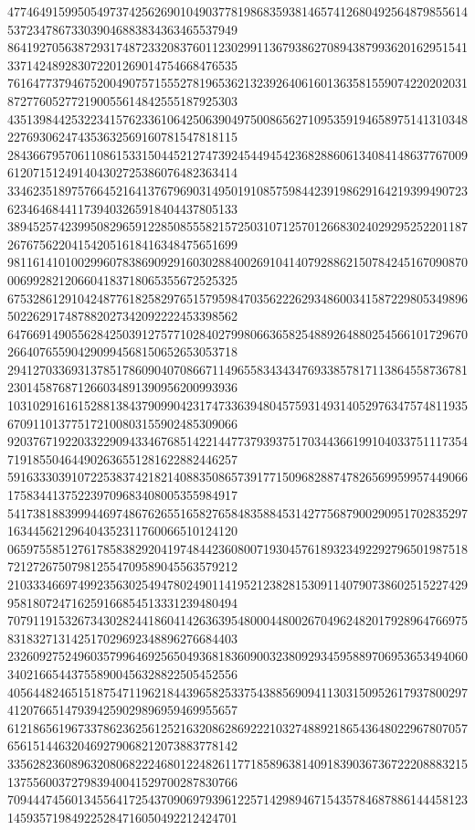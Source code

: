 \begin{DoxyCode}
      477464915995054973742562690104903778198683593814657412680492564879855614537234786733039046883834363465537949
      864192705638729317487233208376011230299113679386270894387993620162951541337142489283072201269014754668476535
      761647737946752004907571555278196536213239264061601363581559074220202031872776052772190055614842555187925303
      435139844253223415762336106425063904975008656271095359194658975141310348227693062474353632569160781547818115
      284366795706110861533150445212747392454494542368288606134084148637767009612071512491404302725386076482363414
      334623518975766452164137679690314950191085759844239198629164219399490723623464684411739403265918404437805133
      389452574239950829659122850855582157250310712570126683024029295252201187267675622041542051618416348475651699
      981161410100299607838690929160302884002691041407928862150784245167090870006992821206604183718065355672525325
      675328612910424877618258297651579598470356222629348600341587229805349896502262917487882027342092222453398562
      647669149055628425039127577102840279980663658254889264880254566101729670266407655904290994568150652653053718
      294127033693137851786090407086671149655834343476933857817113864558736781230145876871266034891390956200993936
      103102916161528813843790990423174733639480457593149314052976347574811935670911013775172100803155902485309066
      920376719220332290943346768514221447737939375170344366199104033751117354719185504644902636551281622882446257
      591633303910722538374218214088350865739177150968288747826569959957449066175834413752239709683408005355984917
      541738188399944697486762655165827658483588453142775687900290951702835297163445621296404352311760066510124120
      065975585127617858382920419748442360800719304576189323492292796501987518721272675079812554709589045563579212
      210333466974992356302549478024901141952123828153091140790738602515227429958180724716259166854513331239480494
      707911915326734302824418604142636395480004480026704962482017928964766975831832713142517029692348896276684403
      232609275249603579964692565049368183609003238092934595889706953653494060340216654437558900456328822505452556
      405644824651518754711962184439658253375438856909411303150952617937800297412076651479394259029896959469955657
      612186561967337862362561252163208628692221032748892186543648022967807057656151446320469279068212073883778142
      335628236089632080682224680122482611771858963814091839036736722208883215137556003727983940041529700287830766
      709444745601345564172543709069793961225714298946715435784687886144458123145935719849225284716050492212424701

\end{DoxyCode}

